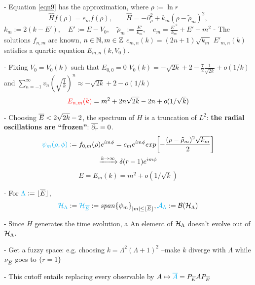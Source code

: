 {
    \color{gray}
    
    - Equation \eqref{eqn9} has the approximation, where $\rho := \ln r$
    \begin{equation}
        \label{harmonic2D}
        \hat H f(\rho) = e_m f(\rho), \qquad
        \hat H = - \partial_\rho^2 + k_m(\rho - \tilde \rho_m)^2,
    \end{equation} $
        k_m := 2(k - E'), \quad
        E' := E - V_0, \quad
        \tilde \rho_m := \frac{E'}{k_m}, \quad
        e_m = \frac{E'^2}{k_m} + E' - m^2
    $
    - The solutions $f_{n,m}$ are known, $n \in \mathbb{N}, m \in \mathbb{Z}$ \then $e_{m, n}(k) = (2n+1)\sqrt{k_m}$ \then $E'_{m,n}(k)$ satisfies a quartic equation \then $E_{m,n}(k, V_0)$.
    
    - Fixing $V_0 = V_0(k)$ such that $E_{0, 0} = 0$ \then $V_0(k) = -\sqrt{2k} + 2 - \frac{7}{2}\frac{1}{\sqrt{2k}} + o(1/k)$ and 
    $\sum_{n = -1}^\infty v_n \left( \sqrt{\frac{1}{k}} \right)^n \approx -\sqrt{2k} + 2 - o(1/k)$ \then
    \begin{equation}
        \textcolor{red}{E_{n, m}(k)} = m^2 + 2n\sqrt{2k} - 2n + o(1/\sqrt{k})
    \end{equation}
    
    - Choosing $\overline{E} < 2 \sqrt{2k} - 2$, the spectrum of $H$ is a truncation of $L^2$: \textbf{the radial oscillations are ``frozen''}: $\overline{\partial_r} = 0$.
    \begin{multline*}
        \lbtext{\psi_m(\rho, \phi)} := f_{0, m}(\rho) e^{im\phi} = c_m e^{im\phi}exp{\left[ -\frac{(\rho - \tilde \rho_m)^2 \sqrt{k_m}}{2} \right]} \\\xrightarrow{k \to \infty} \delta(r-1)e^{i m \phi}
    \end{multline*}
    \begin{equation}
        E = E_m(k) = m^2 + o(1/\sqrt{k})
    \end{equation}
    
    - For $\textcolor{cyan}{\Lambda} := \lfloor \overline{E} \rfloor$, 
    \begin{align}
        \textcolor{cyan}{\mathcal H_{\Lambda}}:= \textcolor{cyan}{\mathcal H_{\overline{E}}} := span\{\psi_m\}_{|m| \leq 
    \lfloor \overline{E} \rfloor} ,
    \textcolor{cyan}{\mathcal A_\Lambda} := \mathcal B(\mathcal H_\Lambda)
    \end{align}
    
    - Since $H$ generates the time evolution, a
    An element of $\mathcal H_\Lambda$ doesn't evolve out of $\mathcal H_\Lambda$.
    
    - Get a fuzzy space: e.g. choosing $k = \Lambda^2(\Lambda+1)^2$ --make $k$ diverge with $\Lambda$ while $\nu_{\overline{E}}$ goes to $\{r = 1\}$
    
    - This cutoff entails replacing every observable by $A \mapsto \textcolor{cyan}{\overline{A}} = P_{\overline{E}} A P_{\overline{E}}$%
}

